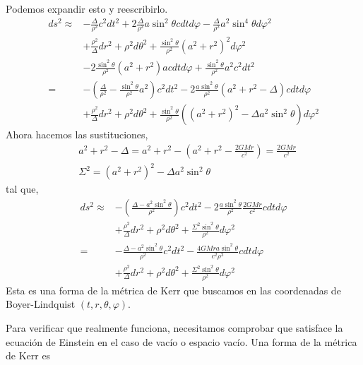 Podemos expandir esto y reescribirlo.
\begin{align}
    d s^2 \approx & -\frac{\Delta}{\rho^2} c^2 d t^2+2 \frac{\Delta}{\rho^2} a \sin ^2 \theta c d t d \varphi-\frac{\Delta}{\rho^2} a^2 \sin ^4 \theta d \varphi^2               \\
                  & +\frac{\rho^2}{\Delta} d r^2+\rho^2 d \theta^2+\frac{\sin ^2 \theta}{\rho^2}\left(a^2+r^2\right)^2 d \varphi^2                                               \\
                  & -2 \frac{\sin ^2 \theta}{\rho^2}\left(a^2+r^2\right) a c d t d \varphi+\frac{\sin ^2 \theta}{\rho^2} a^2 c^2 d t^2                                           \\
    =             & -\left(\frac{\Delta}{\rho^2}-\frac{\sin ^2 \theta}{\rho^2} a^2\right) c^2 d t^2-2 \frac{a \sin ^2 \theta}{\rho^2}\left(a^2+r^2-\Delta\right) c d t d \varphi \\
                  & +\frac{\rho^2}{\Delta} d r^2+\rho^2 d \theta^2+\frac{\sin ^2 \theta}{\rho^2}\left(\left(a^2+r^2\right)^2-\Delta a^2 \sin ^2 \theta\right) d \varphi^2
\end{align}
Ahora hacemos las sustituciones,
\begin{align}
     & a^2+r^2-\Delta=a^2+r^2-\left(a^2+r^2-\frac{2 G M r}{c^2}\right)=\frac{2 G M r}{c^2} \\
     & \Sigma^2=\left(a^2+r^2\right)^2-\Delta a^2 \sin ^2 \theta
\end{align}
tal que,
\begin{align}
    d s^2 \approx & -\left(\frac{\Delta-a^2 \sin ^2 \theta}{\rho^2}\right) c^2 d t^2-2 \frac{a \sin ^2 \theta}{\rho^2} \frac{2 G M r}{c^2} c d t d \varphi \\
                  & +\frac{\rho^2}{\Delta} d r^2+\rho^2 d \theta^2+\frac{\Sigma^2 \sin ^2 \theta}{\rho^2} d \varphi^2                                      \\
    =             & -\frac{\Delta-a^2 \sin ^2 \theta}{\rho^2} c^2 d t^2-\frac{4 G M r a \sin ^2 \theta}{c^2 \rho^2} c d t d \varphi                        \\
                  & +\frac{\rho^2}{\Delta} d r^2+\rho^2 d \theta^2+\frac{\Sigma^2 \sin ^2 \theta}{\rho^2} d \varphi^2
\end{align}
Esta es una forma de la métrica de Kerr que buscamos en las coordenadas de Boyer-Lindquist $(t, r, \theta, \varphi)$.

Para verificar que realmente funciona, necesitamos comprobar que satisface la ecuación de Einstein en el caso de vacío o espacio vacío.
Una forma de la métrica de Kerr es

